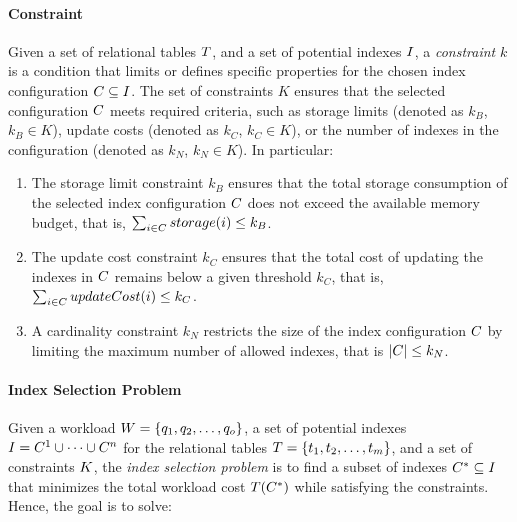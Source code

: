 \paragraph{Constraint} Given a set of relational tables $T$, %
and a set of potential indexes $I$, a \textit{constraint} $k$ is a condition that limits or defines specific properties for the chosen index configuration $C \subseteq I$. The set of constraints $K$ ensures that the selected configuration $C$ meets required criteria, such as storage limits (denoted as $k_B$, $k_B \in K$), update costs (denoted as $k_C$, $k_C \in K$), or the number of indexes in the configuration (denoted as $k_N$, $k_N \in K$). In particular:
\begin{enumerate}
     \item The storage limit constraint $k_B$ ensures that the total storage consumption of the selected index configuration $C$ does not exceed the available memory budget, that is, $\sum_{i \in C} storage(i) \leq k_B$.
   
    \item The update cost constraint $k_C$ ensures that the total cost of updating the indexes in $C$ remains below a given threshold $k_C$, that is, $\sum_{i \in C} updateCost(i) \leq k_C$.
   
    \item A cardinality constraint $k_N$ restricts the size of the index configuration $C$ by limiting the maximum number of allowed indexes, that is $|C| \leq k_N$.
\end{enumerate}

\paragraph{Index Selection Problem} 

Given a workload $W = \{ q_1, q_2, \dots, q_o \}$, a set of potential indexes  $I = C^1 \cup \dots \cup C^n$ for the relational tables $T = \{t_1, t_2, \dots, t_m\}$, and a set of constraints $K$, the \textit{index selection problem} is to find a subset of indexes $C^* \subseteq I$ that minimizes the total workload cost $T(C^*)$ while satisfying the constraints. Hence, the goal is to solve:

